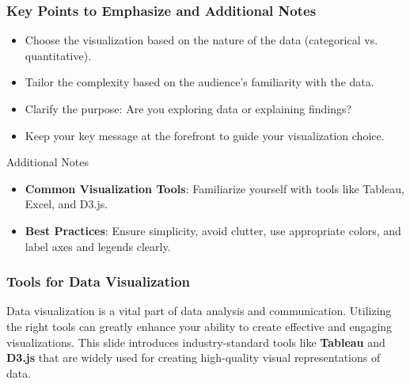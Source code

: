 \documentclass{beamer}
\begin{document}
\begin{frame}[fragile]
    \frametitle{Key Points to Emphasize and Additional Notes}
    \begin{itemize}
        \item Choose the visualization based on the nature of the data (categorical vs. quantitative).
        \item Tailor the complexity based on the audience's familiarity with the data.
        \item Clarify the purpose: Are you exploring data or explaining findings?
        \item Keep your key message at the forefront to guide your visualization choice.
    \end{itemize}
    
    \begin{block}{Additional Notes}
        \begin{itemize}
            \item \textbf{Common Visualization Tools}: Familiarize yourself with tools like Tableau, Excel, and D3.js.
            \item \textbf{Best Practices}: Ensure simplicity, avoid clutter, use appropriate colors, and label axes and legends clearly.
        \end{itemize}
    \end{block}
\end{frame}

\begin{frame}[fragile]
    \frametitle{Tools for Data Visualization}
    Data visualization is a vital part of data analysis and communication. 
    Utilizing the right tools can greatly enhance your ability to create effective and engaging visualizations.
    This slide introduces industry-standard tools like \textbf{Tableau} and \textbf{D3.js} that are widely used for creating high-quality visual representations of data.
\end{frame}
\end{document}
